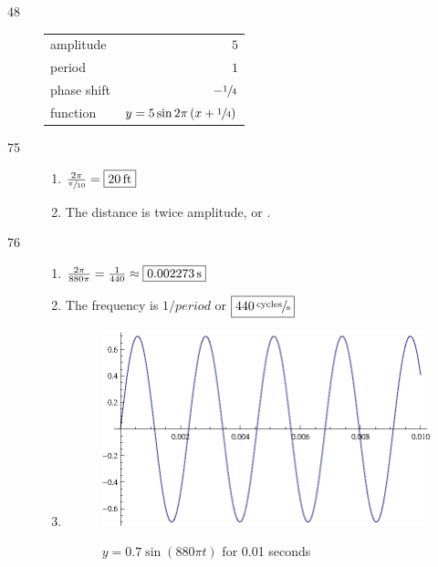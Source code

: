\documentclass{exam}
\begin{document}
\begin{description}
    \item[48]
      \begin{tabular}[H]{lr}
        \toprule
        amplitude   & $5$ \\
        period      & $1$ \\
        phase shift & $- \sfrac{1}{4}$ \\
        function    & $y = 5 \sin 2 \pi \left( x + \sfrac{1}{4} \right)$ \\
        \bottomrule
      \end{tabular}

    \item[75]
      \begin{enumerate}[a]
        \item $\frac{2 \pi}{\sfrac{\pi}{10}} = \boxed{ \unit[20]{ft} }$
        \item The distance is twice amplitude, or .
      \end{enumerate}

    \pagebreak

    \item[76]
      \begin{enumerate}[a]
        \item $\frac{2 \pi}{880 \pi} = \frac{1}{440} \approx \boxed{ \unit[ 0.002273 ]{s} }$
        \item The frequency is $1/period$ or $\boxed{ \unit[440]{\sfrac{cycles}{s}} }$

        \item
          \begin{figure}[H]
            \centering
            \includegraphics[scale=1.0]{exercise76.eps}

            $y = 0.7 \sin \left( 880 \pi t \right)$ for 0.01 seconds
          \end{figure}

      \end{enumerate}

    \end{description}
\end{document}
